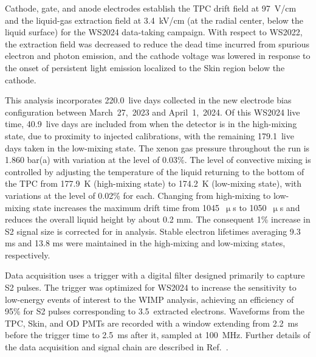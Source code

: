 \documentclass[%
 reprint,
 superscriptaddress,
 amsmath,amssymb,
 prl,
floatfix,
]{revtex4-2}
\newcommand{\RevA}[1]{{\color{black}#1}}
\begin{document}
Cathode, gate, and anode electrodes establish the TPC drift field at 97~V/cm and the liquid-gas extraction field at 3.4~kV/cm (at the radial center, below the liquid surface) for the WS2024 data-taking campaign. With respect to WS2022, the extraction field was decreased to reduce the dead time incurred from spurious electron and photon emission, and the cathode voltage was lowered in response to the onset of persistent light emission localized to the Skin region below the cathode.

This analysis incorporates 220.0~live days collected in the new electrode bias configuration between March~27,~2023 and April~1,~2024. Of this WS2024 live time, 40.9~live days are included from when the detector is in the high-mixing state, due to proximity to injected calibrations, with the remaining 179.1~live days taken in the low-mixing state. The xenon gas pressure throughout the run is 1.860 bar(a) with variation at the level of 0.03\%. The level of convective mixing is controlled by adjusting the temperature of the liquid returning to the bottom of the TPC from 177.9~K (high-mixing state) to 174.2~K (low-mixing state), with variations at the level of 0.02\% for each. Changing from high-mixing to low-mixing state increases the maximum drift time from 1045~$\upmu$s to 1050~$\upmu$s and reduces the overall liquid height by about 0.2 mm. The consequent 1\% increase in S2 signal size is corrected for in analysis. \RevA{Stable electron lifetimes
averaging 9.3 ms and 13.8 ms were maintained in the
high-mixing and low-mixing states, respectively.}

Data acquisition uses a trigger with a digital filter designed primarily to capture S2 pulses. The trigger was optimized for WS2024 to increase the sensitivity to low-energy events of interest to the WIMP analysis, achieving an efficiency of 95\% for S2 pulses corresponding to 3.5~extracted electrons. Waveforms from the TPC, Skin, and OD PMTs are recorded with a window extending from 2.2~ms before the trigger time to 2.5~ms after it, sampled at 100~MHz. Further details of the data acquisition and signal chain are described in Ref.~\cite{LZ_DAQ}.
\end{document}
